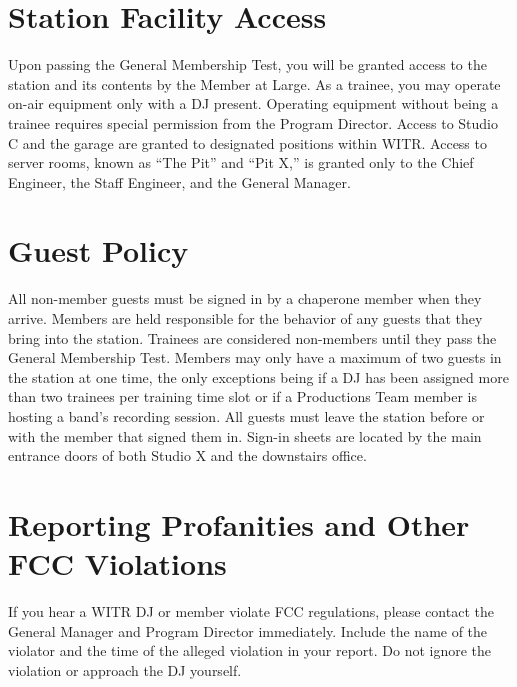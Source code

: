 \documentclass{witrman}
\begin{document}
\section{Station Facility Access}
Upon passing the General Membership Test, you will be granted access to the
station and its contents by the Member at Large. As a trainee, you may operate
on-air equipment only with a DJ present. Operating equipment without being a
trainee requires special permission from the Program Director. Access to Studio
C and the garage are granted to designated positions within WITR. Access to
server rooms, known as ``The Pit'' and ``Pit X,'' is granted only to the Chief
Engineer, the Staff Engineer, and the General Manager.

\section{Guest Policy}
All non-member guests must be signed in by a chaperone member when they arrive.
Members are held responsible for the behavior of any guests that they bring into
the station. Trainees are considered non-members until they pass the General
Membership Test. Members may only have a maximum of two guests in the station at
one time, the only exceptions being if a DJ has been assigned more than two
trainees per training time slot or if a Productions Team member is hosting a
band’s recording session. All guests must leave the station before or with the
member that signed them in. Sign-in sheets are located by the main entrance
doors of both Studio X and the downstairs office.

\section{Reporting Profanities and Other FCC Violations}
If you hear a WITR DJ or member violate FCC regulations, please contact the
General Manager and Program Director immediately. Include the name of the
violator and the time of the alleged violation in your report. Do not ignore the
violation or approach the DJ yourself.
\end{document}
